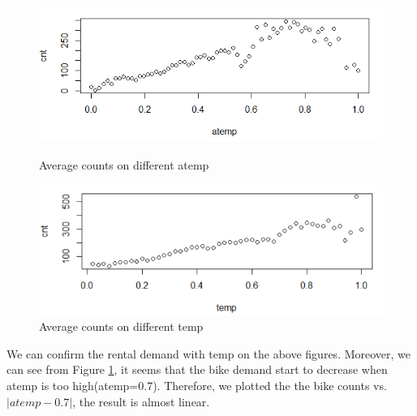 \documentclass[12pt]{article}
\begin{document}
	\begin{figure}[H]
		\centering
		\begin{minipage}{.45\textwidth}
			\centering
			\includegraphics[width=\linewidth]{figures/atemp_cnt.png}
			\caption{Average counts on different atemp}
			\label{fig:atemp}
		\end{minipage}%
		\begin{minipage}{.45\textwidth}
			\centering
			\includegraphics[width=\linewidth]{figures/temp_cnt.png}
			\caption{Average counts on different temp}
		\end{minipage}
	\end{figure}
   We can confirm the rental demand with temp on the above figures. Moreover, we can see from Figure \ref{fig:atemp}, it seems that the bike demand start to decrease when atemp is too high(atemp=0.7). Therefore, we plotted the the bike counts vs. $|atemp-0.7|$, the result is almost linear.
\end{document}
